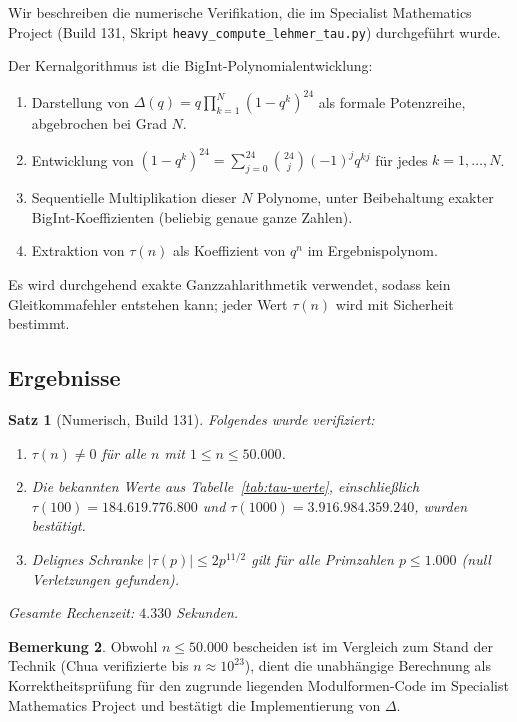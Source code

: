 \documentclass[12pt,a4paper]{amsart}
\newtheorem{theorem}{Satz}[section]
\theoremstyle{definition}
\newtheorem{remark}[theorem]{Bemerkung}
\begin{document}
Wir beschreiben die numerische Verifikation, die im Specialist Mathematics Project
(Build 131, Skript \texttt{heavy\_compute\_lehmer\_tau.py}) durchgeführt wurde.

Der Kernalgorithmus ist die BigInt-Polynomialentwicklung:
\begin{enumerate}[label=\arabic*., leftmargin=2em]
  \item Darstellung von $\Delta(q) = q \prod_{k=1}^{N}(1-q^k)^{24}$ als formale
        Potenzreihe, abgebrochen bei Grad $N$.
  \item Entwicklung von $(1-q^k)^{24} = \sum_{j=0}^{24}\binom{24}{j}(-1)^j q^{kj}$
        für jedes $k = 1, \ldots, N$.
  \item Sequentielle Multiplikation dieser $N$ Polynome, unter Beibehaltung exakter
        BigInt-Koeffizienten (beliebig genaue ganze Zahlen).
  \item Extraktion von $\tau(n)$ als Koeffizient von $q^n$ im Ergebnispolynom.
\end{enumerate}

Es wird durchgehend exakte Ganzzahlarithmetik verwendet, sodass kein
Gleitkommafehler entstehen kann; jeder Wert $\tau(n)$ wird mit Sicherheit bestimmt.

\subsection{Ergebnisse}

\begin{theorem}[Numerisch, Build 131]\label{thm:numerisch}
  Folgendes wurde verifiziert:
  \begin{enumerate}[label=(\roman*)]
    \item $\tau(n) \neq 0$ für alle $n$ mit $1 \leq n \leq 50{.}000$.
    \item Die bekannten Werte aus Tabelle~\ref{tab:tau-werte}, einschließlich
          $\tau(100) = 184{.}619{.}776{.}800$ und
          $\tau(1000) = 3{.}916{.}984{.}359{.}240$, wurden bestätigt.
    \item Delignes Schranke $|\tau(p)| \leq 2p^{11/2}$ gilt für alle Primzahlen
          $p \leq 1{.}000$ (null Verletzungen gefunden).
  \end{enumerate}
  Gesamte Rechenzeit: $4{.}330$ Sekunden.
\end{theorem}

\begin{remark}
  Obwohl $n \leq 50{.}000$ bescheiden ist im Vergleich zum Stand der Technik
  (Chua \cite{Chua2004} verifizierte bis $n \approx 10^{23}$), dient die
  unabhängige Berechnung als Korrektheitsprüfung für den zugrunde liegenden
  Modulformen-Code im Specialist Mathematics Project und bestätigt die
  Implementierung von $\Delta$.
\end{remark}
\end{document}
